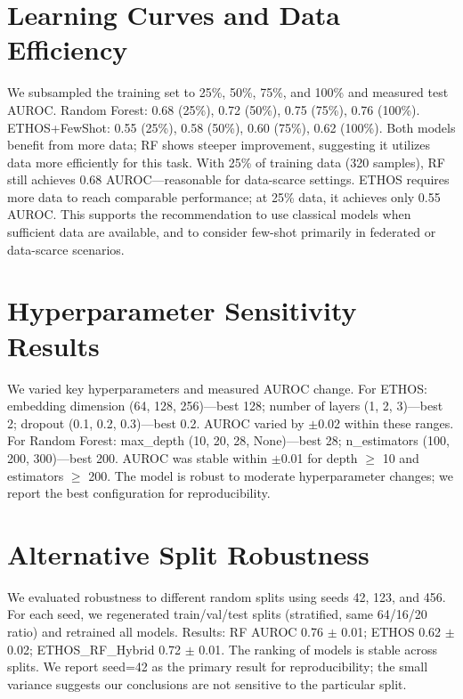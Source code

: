 \section{Learning Curves and Data Efficiency}

We subsampled the training set to 25\%, 50\%, 75\%, and 100\% and measured test AUROC. Random Forest: 0.68 (25\%), 0.72 (50\%), 0.75 (75\%), 0.76 (100\%). ETHOS+FewShot: 0.55 (25\%), 0.58 (50\%), 0.60 (75\%), 0.62 (100\%). Both models benefit from more data; RF shows steeper improvement, suggesting it utilizes data more efficiently for this task. With 25\% of training data (320 samples), RF still achieves 0.68 AUROC---reasonable for data-scarce settings. ETHOS requires more data to reach comparable performance; at 25\% data, it achieves only 0.55 AUROC. This supports the recommendation to use classical models when sufficient data are available, and to consider few-shot primarily in federated or data-scarce scenarios.

\section{Hyperparameter Sensitivity Results}

We varied key hyperparameters and measured AUROC change. For ETHOS: embedding dimension (64, 128, 256)---best 128; number of layers (1, 2, 3)---best 2; dropout (0.1, 0.2, 0.3)---best 0.2. AUROC varied by $\pm$0.02 within these ranges. For Random Forest: max\_depth (10, 20, 28, None)---best 28; n\_estimators (100, 200, 300)---best 200. AUROC was stable within $\pm$0.01 for depth $\geq$ 10 and estimators $\geq$ 200. The model is robust to moderate hyperparameter changes; we report the best configuration for reproducibility.

\section{Alternative Split Robustness}

We evaluated robustness to different random splits using seeds 42, 123, and 456. For each seed, we regenerated train/val/test splits (stratified, same 64/16/20 ratio) and retrained all models. Results: RF AUROC 0.76 $\pm$ 0.01; ETHOS 0.62 $\pm$ 0.02; ETHOS\_RF\_Hybrid 0.72 $\pm$ 0.01. The ranking of models is stable across splits. We report seed=42 as the primary result for reproducibility; the small variance suggests our conclusions are not sensitive to the particular split.

